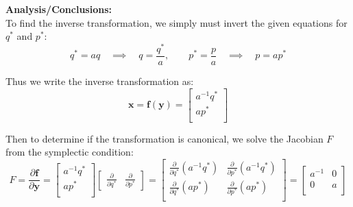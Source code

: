\documentclass[titlepage]{article}
\begin{document}
\textbf{Analysis/Conclusions:}\\

To find the inverse transformation, we simply must invert the given equations for $q^*$ and $p^*$:
\begin{equation}
	q^*=aq\quad\implies\quad q=\frac{q^*}{a},\qquad p^*=\frac{p}{a}\quad\implies\quad p=ap^*
\end{equation}

\begin{mdframed}[linewidth=1pt, innertopmargin=10pt, innerbottommargin=10pt]
	Thus we write the inverse transformation as:
	\begin{equation}
		\boldsymbol{x}=\boldsymbol{f}(\boldsymbol{y})=
		\begin{bmatrix}
			a^{-1}q^* \\
			ap^* \\
		\end{bmatrix}
	\end{equation}
\end{mdframed}

Then to determine if the transformation is canonical, we solve the Jacobian $F$ from the symplectic condition:
\begin{equation}
	F=\frac{\partial\boldsymbol{f}}{\partial\boldsymbol{y}}=
	\begin{bmatrix}
		a^{-1}q^* \\
		ap^* \\
	\end{bmatrix}
	\begin{bmatrix}
		\frac{\partial}{\partial q^*} & \frac{\partial}{\partial p^*}
	\end{bmatrix}=
	\begin{bmatrix}
		\frac{\partial}{\partial q^*}\left(a^{-1}q^*\right) & \frac{\partial}{\partial p^*}\left(a^{-1}q^*\right) \\
		\frac{\partial}{\partial q^*}\left(ap^*\right) & \frac{\partial}{\partial p^*}\left(ap^*\right) \\
	\end{bmatrix}=
	\begin{bmatrix}
		a^{-1} & 0 \\
		0 & a \\
	\end{bmatrix}
\end{equation}
\end{document}
